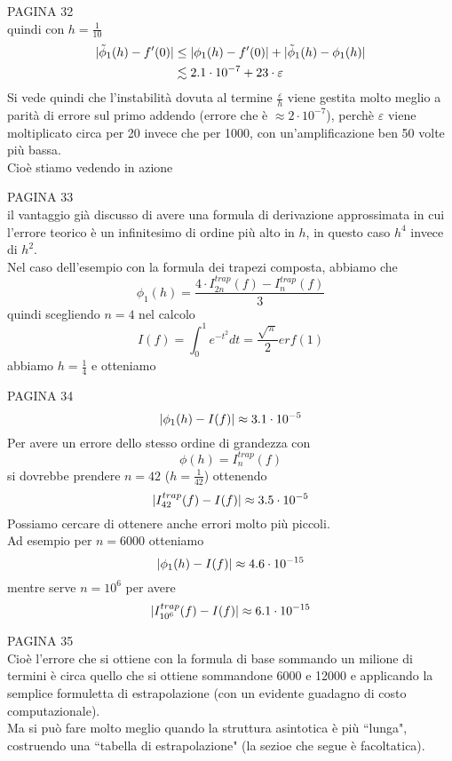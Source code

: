 \documentclass[12pt,a4paper]{article}
\DeclarePairedDelimiter{\abs}{\lvert}{\rvert}
\begin{document}
PAGINA 32 \\%
quindi con $h=\frac{1}{10}$
\[\begin{split}
    \abs{\tilde{\phi}_1 (h) - f'(0)} & \le \abs{\phi_1(h) - f'(0)} + \abs{\tilde{\phi}_1 (h) - \phi_1(h)} \\
    & \lesssim 2.1 \cdot 10^{-7} + 23 \cdot\varepsilon 
\end{split}\]
Si vede quindi che l'instabilità dovuta al termine $\frac{\varepsilon}{h}$ viene gestita molto meglio a parità di errore sul primo addendo (errore che è $\approx 2 \cdot 10^{-7}$), perchè $\varepsilon$ viene moltiplicato circa per 20 invece che per 1000, con un'amplificazione ben 50 volte più bassa. \\
Cioè stiamo vedendo in azione

PAGINA 33 \\%
il vantaggio già discusso di avere una formula di derivazione approssimata in cui l'errore teorico è un infinitesimo di ordine più alto in $h$, in questo caso $h^4$ invece di $h^2$.\\
Nel caso dell'esempio con la formula dei trapezi composta, abbiamo che
\[\phi_1(h) = \frac{4 \cdot I_{2n}^{trap}(f) - I_n^{trap}(f)}{3}\]
quindi scegliendo $n = 4$ nel calcolo
\[I(f) = \int_0^1 e^{-t^2} dt = \frac{\sqrt{\pi}}{2} erf (1)\]
abbiamo $h = \frac{1}{4}$ e otteniamo

PAGINA 34 \\%
\[\abs{\phi_1(h) - I(f)} \approx 3.1 \cdot 10^{-5}\]
Per avere un errore dello stesso ordine di grandezza con 
\[\phi(h) = I_n^{trap} (f)\]
si dovrebbe prendere $n=42$ ($h=\frac{1}{42}$) ottenendo
\[\abs{I_{42}^{trap}(f) - I(f)} \approx 3.5 \cdot 10^{-5}\]
Possiamo cercare di ottenere anche errori molto più piccoli.\\
Ad esempio per $n=6000$ otteniamo
\[\abs{\phi_1(h) - I(f)} \approx 4.6 \cdot 10^{-15}\]
mentre serve $n = 10^6$ per avere
\[\abs{I_{10^6}^{trap}(f) - I(f)} \approx 6.1 \cdot 10^{-15}\]

PAGINA 35\\ %
Cioè l'errore che si ottiene con la formula di base sommando un milione di termini è circa quello che si ottiene sommandone 6000 e  12000 e applicando la semplice formuletta di estrapolazione (con un evidente guadagno di costo computazionale).\\
Ma si può fare molto meglio quando la struttura asintotica è più ``lunga", costruendo una ``tabella di estrapolazione" (la sezioe che segue è facoltatica).\\\\
\end{document}
